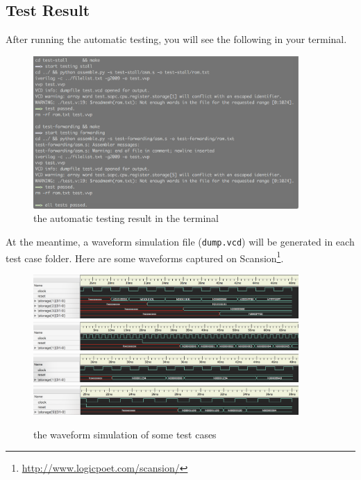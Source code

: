 \documentclass{article}
\begin{document}
\subsection{Test Result}
After running the automatic testing, you will see the following in your terminal.
\begin{figure}[!h]
\begin{center}
\includegraphics[width=0.9\textwidth]{image/terminal}
\caption{the automatic testing result in the terminal}
\end{center}
\end{figure}

At the meantime, a waveform simulation file (\texttt{dump.vcd}) will be generated in each test case folder. Here are some waveforms captured on Scansion\footnote{\url{http://www.logicpoet.com/scansion/}}.
\begin{figure}[!h]
\begin{center}
\includegraphics[width=0.9\textwidth]{image/test-logic}
\includegraphics[width=0.9\textwidth]{image/test-jump}
\includegraphics[width=0.9\textwidth]{image/test-stall}
\includegraphics[width=0.9\textwidth]{image/test-forwarding}
\caption{the waveform simulation of some test cases}
\end{center}
\end{figure}
\end{document}
